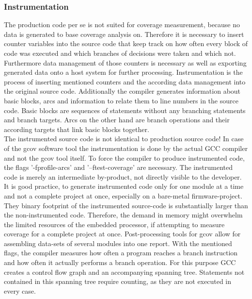 \documentclass[master,english,smartquotes,apa]{hgbthesis}
\begin{document}
			\subsubsection{Instrumentation}
				The production code per se is not suited for coverage measurement, because no data is generated to base coverage analysis on. Therefore it is necessary to insert counter variables into the source code that keep track on how often every block of code was executed and which branches of decisions were taken and which not. Furthermore data management of those counters is necessary as well as exporting generated data onto a host system for further processing. Instrumentation is the process of inserting mentioned counters and the according data management into the original source code. Additionally the compiler generates information about basic blocks, arcs and information to relate them to line numbers in the source code. Basic blocks are sequences of statements without any branching statements and branch targets. Arcs on the other hand are branch operations and their according targets that link basic blocks together. \\
				
				The instrumented source code is not identical to production source code! In case of the gcov software tool the instrumentation is done by the actual GCC compiler and not the gcov tool itself. To force the compiler to produce instrumented code, the flags '-fprofile-arcs' and '–ftest-coverage' are necessary. The instrumented code is merely an intermediate by-product, not directly visible to the developer. It is good practice, to generate instrumented code only for one module at a time and not a complete project at once, especially on a bare-metal firmware-project. They binary footprint of the instrumented source-code is substantially larger than the non-instrumented code. Therefore, the demand in memory might overwhelm the limited resources of the embedded processor, if attempting to measure coverage for a complete project at once. Post-processing tools for gcov allow for assembling data-sets of several modules into one report. With the mentioned flags, the compiler measures how often a program reaches a branch instruction and how often it actually performs a branch operation. For this purpose GCC creates a control flow graph and an accompanying spanning tree. Statements not contained in this spanning tree require counting, as they are not executed in every case. \\
				
				
\end{document}
